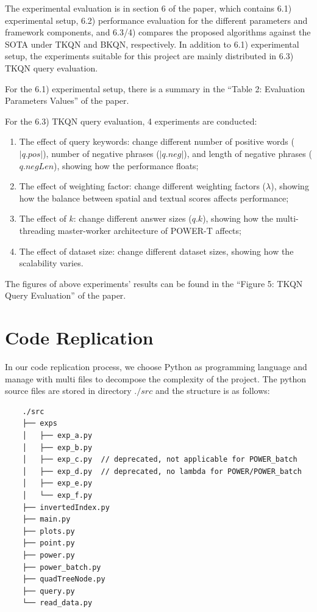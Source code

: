 \documentclass[]{IEEEphot}
\begin{document}
The experimental evaluation is in section 6 of the paper, which contains 6.1) experimental setup, 6.2) performance evaluation for the different parameters and framework components, and 6.3/4) compares the proposed algorithms against the SOTA under TKQN and BKQN, respectively. In addition to 6.1) experimental setup, the experiments suitable for this project are mainly distributed in 6.3) TKQN query evaluation.

For the 6.1) experimental setup, there is a summary in the “Table 2: Evaluation Parameters Values” of the paper.

For the 6.3) TKQN query evaluation, 4 experiments are conducted:

\begin{enumerate}
    \item The effect of query keywords: change different number of positive words ($|q.pos|$), number of negative phrases ($|q.neg|$), and length of negative phrases ($q.negLen$), showing how the performance floats;
    \item The effect of weighting factor: change different weighting factors ($\lambda$), showing how the balance between spatial and textual scores affects performance;
    \item The effect of $k$: change different answer sizes ($q.k$), showing how the multi-threading master-worker architecture of POWER-T affects;
    \item The effect of dataset size: change different dataset sizes, showing how the scalability varies.
\end{enumerate}

The figures of above experiments’ results can be found in the “Figure 5: TKQN Query Evaluation” of the paper.

\section{Code Replication}

In our code replication process, we choose Python as programming language and manage with multi files to decompose the complexity of the project. The python source files are stored in directory $./src$ and the structure is as follows:

\begin{lstlisting}
    ./src
    ├── exps
    │   ├── exp_a.py
    │   ├── exp_b.py
    │   ├── exp_c.py  // deprecated, not applicable for POWER_batch
    │   ├── exp_d.py  // deprecated, no lambda for POWER/POWER_batch
    │   ├── exp_e.py
    │   └── exp_f.py
    ├── invertedIndex.py
    ├── main.py
    ├── plots.py
    ├── point.py
    ├── power.py
    ├── power_batch.py
    ├── quadTreeNode.py
    ├── query.py
    └── read_data.py
\end{lstlisting}
\end{document}
